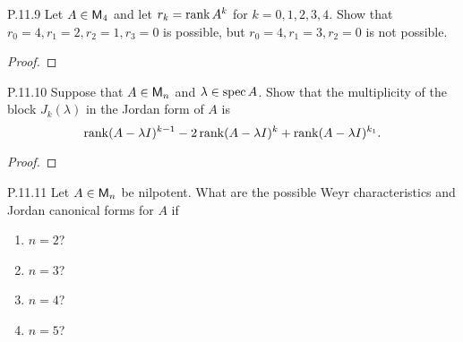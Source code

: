 \documentclass{../homework}
\begin{document}
\begin{problems}
\item[P.11.9] Let \(A \in \mathsf{M}_4\) and let \(r_k = \operatorname{rank} A^k\) for
  \(k = 0, 1, 2, 3, 4\).  Show that
  \(r_0 = 4, r_1 = 2, r_2 = 1, r_3 = 0\) is possible, but
  \(r_0 = 4, r_1 = 3, r_2 = 0\) is not possible.

  \begin{solution}
    \begin{proof}

    \end{proof}
  \end{solution}

\item[P.11.10] Suppose that \(A \in \mathsf{M}_n\) and
  \(\lambda \in \operatorname{spec} A\).  Show that the multiplicity of the block
  \(J_k(\lambda)\) in the Jordan form of \(A\) is
  \[
    \operatorname{rank}(A-\lambda I)^{k-1}
    - 2 \operatorname{rank}(A-\lambda I)^k
    + \operatorname{rank}(A-\lambda I)^{k_1}.
  \]

  \begin{solution}
    \begin{proof}

    \end{proof}
  \end{solution}

\item[P.11.11] Let \(A \in \mathsf{M}_n\) be nilpotent.  What are the possible
  Weyr characteristics and Jordan canonical forms for \(A\) if
  \begin{enumerate}
  \item \(n=2\)?

    \begin{solution}

    \end{solution}

  \item \(n=3\)?

    \begin{solution}

    \end{solution}

  \item \(n=4\)?

    \begin{solution}

    \end{solution}

  \item \(n=5\)?

    \begin{solution}

    \end{solution}
  \end{enumerate}


\end{problems}
\end{document}
